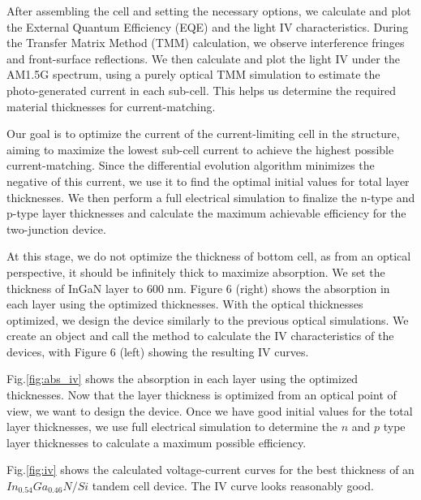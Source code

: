 \documentclass[preprint,12pt]{elsarticle}
\begin{document}
After assembling the cell and setting the necessary options, we calculate and plot the External Quantum Efficiency (EQE) and the light IV characteristics. During the Transfer Matrix Method (TMM) calculation, we observe interference fringes and front-surface reflections. We then calculate and plot the light IV under the AM1.5G spectrum, using a purely optical TMM simulation to estimate the photo-generated current in each sub-cell. This helps us determine the required material thicknesses for current-matching.

Our goal is to optimize the current of the current-limiting cell in the structure, aiming to maximize the lowest sub-cell current to achieve the highest possible current-matching. Since the differential evolution algorithm minimizes the negative of this current, we use it to find the optimal initial values for total layer thicknesses. We then perform a full electrical simulation to finalize the n-type and p-type layer thicknesses and calculate the maximum achievable efficiency for the two-junction device.

At this stage, we do not optimize the thickness of bottom cell, as from an optical perspective, it should be infinitely thick to maximize absorption. We set the thickness of InGaN layer to 600 nm. Figure 6 (right) shows the absorption in each layer using the optimized thicknesses. With the optical thicknesses optimized, we design the device similarly to the previous optical simulations. We create an object and call the method to calculate the IV characteristics of the devices, with Figure 6 (left) showing the resulting IV curves.




















Fig.\ref{fig:abs_iv} shows the absorption in each layer using the optimized thicknesses. Now that the layer thickness is optimized from an optical point of view, we want to design the device. Once we have good initial values for the total layer thicknesses, we use full electrical simulation to determine the $n$ and $p$ type layer thicknesses to calculate a maximum possible efficiency.


Fig.\ref{fig:iv} shows the calculated voltage-current curves for the best thickness of an $In_{0.54}Ga_{0.46}N/Si$ tandem cell device. The IV curve looks reasonably good.
\end{document}
